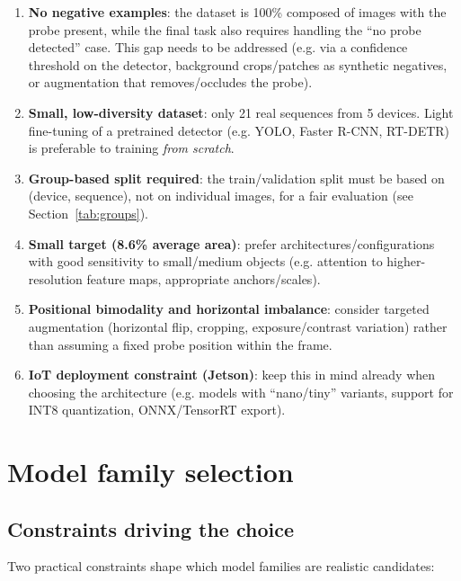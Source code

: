 \documentclass[11pt,a4paper]{article}
\begin{document}
\begin{enumerate}[nosep]
    \item \textbf{No negative examples}: the dataset is 100\% composed of images with the probe
          present, while the final task also requires handling the ``no probe detected'' case.
          This gap needs to be addressed (e.g. via a confidence threshold on the detector,
          background crops/patches as synthetic negatives, or augmentation that removes/occludes
          the probe).
    \item \textbf{Small, low-diversity dataset}: only 21 real sequences from 5 devices. Light
          fine-tuning of a pretrained detector (e.g. YOLO, Faster R-CNN, RT-DETR) is preferable
          to training \emph{from scratch}.
    \item \textbf{Group-based split required}: the train/validation split must be based on
          (device, sequence), not on individual images, for a fair evaluation (see
          Section~\ref{tab:groups}).
    \item \textbf{Small target (8.6\% average area)}: prefer architectures/configurations with
          good sensitivity to small/medium objects (e.g. attention to higher-resolution feature
          maps, appropriate anchors/scales).
    \item \textbf{Positional bimodality and horizontal imbalance}: consider targeted augmentation
          (horizontal flip, cropping, exposure/contrast variation) rather than assuming a fixed
          probe position within the frame.
    \item \textbf{IoT deployment constraint (Jetson)}: keep this in mind already when choosing
          the architecture (e.g. models with ``nano/tiny'' variants, support for INT8
          quantization, ONNX/TensorRT export).
\end{enumerate}

\section{Model family selection}
\label{sec:modelfamily}

\subsection{Constraints driving the choice}

Two practical constraints shape which model families are realistic candidates:
\end{document}
